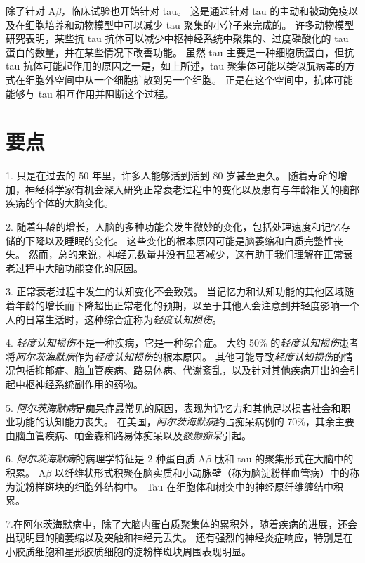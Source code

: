 除了针对 A$\beta$，临床试验也开始针对 tau。
这是通过针对 tau 的主动和被动免疫以及在细胞培养和动物模型中可以减少 tau 聚集的小分子来完成的。
许多动物模型研究表明，某些抗 tau 抗体可以减少中枢神经系统中聚集的、过度磷酸化的 tau 蛋白的数量，并在某些情况下改善功能。
虽然 tau 主要是一种细胞质蛋白，但抗 tau 抗体可能起作用的原因之一是，如上所述，tau 聚集体可能以类似朊病毒的方式在细胞外空间中从一个细胞扩散到另一个细胞。
正是在这个空间中，抗体可能能够与 tau 相互作用并阻断这个过程。



\section{要点}

1. 只是在过去的 50 年里，许多人能够活到活到 80 岁甚至更久。
随着寿命的增加，神经科学家有机会深入研究正常衰老过程中的变化以及患有与年龄相关的脑部疾病的个体的大脑变化。


2. 随着年龄的增长，人脑的多种功能会发生微妙的变化，包括处理速度和记忆存储的下降以及睡眠的变化。
这些变化的根本原因可能是脑萎缩和白质完整性丧失。
然而，总的来说，神经元数量并没有显著减少，这有助于我们理解在正常衰老过程中大脑功能变化的原因。


3. 正常衰老过程中发生的认知变化不会致残。
当记忆力和认知功能的其他区域随着年龄的增长而下降超出正常老化的预期，以至于其他人会注意到并轻度影响一个人的日常生活时，这种综合症称为\textit{轻度认知损伤}。


4. \textit{轻度认知损伤}不是一种疾病，它是一种综合症。
大约 50\% 的\textit{轻度认知损伤}患者将\textit{阿尔茨海默病}作为\textit{轻度认知损伤}的根本原因。
其他可能导致\textit{轻度认知损伤}的情况包括抑郁症、脑血管疾病、路易体病、代谢紊乱，以及针对其他疾病开出的会引起中枢神经系统副作用的药物。


5. \textit{阿尔茨海默病}是痴呆症最常见的原因，表现为记忆力和其他足以损害社会和职业功能的认知能力丧失。
在美国，\textit{阿尔茨海默病}约占痴呆病例的 70\%，其余主要由脑血管疾病、帕金森和路易体痴呆以及\textit{额颞痴呆}引起。


6. \textit{阿尔茨海默病}的病理学特征是 2 种蛋白质 A$\beta$ 肽和 tau 的聚集形式在大脑中的积累。
A$\beta$ 以纤维状形式积聚在脑实质和小动脉壁（称为脑淀粉样血管病）中的称为淀粉样斑块的细胞外结构中。
Tau 在细胞体和树突中的神经原纤维缠结中积累。


7.在阿尔茨海默病中，除了大脑内蛋白质聚集体的累积外，随着疾病的进展，还会出现明显的脑萎缩以及突触和神经元丢失。
还有强烈的神经炎症响应，特别是在小胶质细胞和星形胶质细胞的淀粉样斑块周围表现明显。


